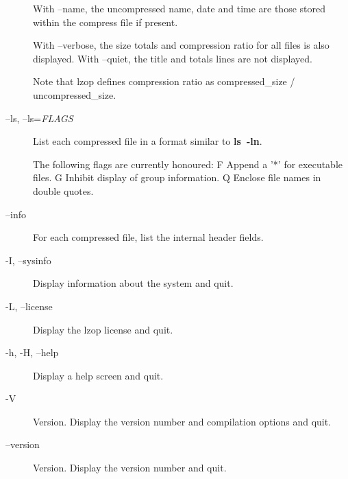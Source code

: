 \begin{description}
With --name, the uncompressed name, date and time
are those stored within the compress file if present.



With --verbose, the size totals and compression
ratio for all files is also displayed. With
--quiet, the title and totals lines are not displayed.



Note that lzop defines compression ratio
as compressed\_size / uncompressed\_size.


\item[{--ls, --ls=\textit{FLAGS}}] \mbox{}

List each compressed file in a format similar to \textbf{ls~-ln}.



The following flags are currently honoured:
  F  Append a '*' for executable files.
  G  Inhibit display of group information.
  Q  Enclose file names in double quotes.


\item[{--info}] \mbox{}

For each compressed file, list the internal header fields.


\item[{-I, --sysinfo}] \mbox{}

Display information about the system and quit.


\item[{-L, --license}] \mbox{}

Display the lzop license and quit.


\item[{-h, -H, --help}] \mbox{}

Display a help screen and quit.


\item[{-V}] \mbox{}

Version. Display the version number and compilation
options and quit.


\item[{--version}] \mbox{}

Version. Display the version number and quit.

\end{description}
